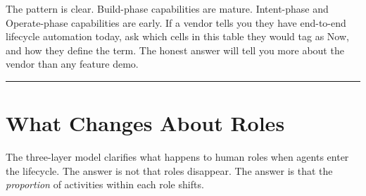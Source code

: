 \documentclass[
  a4paper,
  DIV=11,
  numbers=noendperiod]{scrreprt}
\begin{document}
The pattern is clear. Build-phase capabilities are mature. Intent-phase
and Operate-phase capabilities are early. If a vendor tells you they
have end-to-end lifecycle automation today, ask which cells in this
table they would tag as Now, and how they define the term. The honest
answer will tell you more about the vendor than any feature demo.

\begin{center}\rule{0.5\linewidth}{0.5pt}\end{center}

\section{What Changes About Roles}\label{what-changes-about-roles}

The three-layer model clarifies what happens to human roles when agents
enter the lifecycle. The answer is not that roles disappear. The answer
is that the \emph{proportion} of activities within each role shifts.
\end{document}
